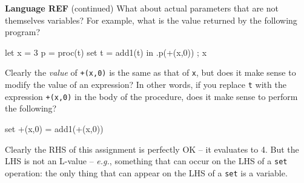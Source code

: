\begin{minipage}[t]{\sw}
\slidenumber
\LARGE
{\bf Language REF} (continued)\exx
What about actual parameters that are not themselves variables?
For example, what is the value returned by the following program?
\begin{qv}
let
  x = 3
  p = proc(t) set t = add1(t)
in
  { .p(+(x,0)) ; x }
\end{qv}
Clearly the {\em value} of \verb'+(x,0)' is the same
as that of \verb'x',
but does it make sense to modify the value of an expression?
In other words, if you replace \verb't' with the expression \verb'+(x,0)'
in the body of the procedure,
does it make sense to perform the following?
\begin{qv}
set +(x,0) = add1(+(x,0))
\end{qv}
Clearly the RHS of this assignment is perfectly OK --
it evaluates to 4.
But the LHS is not an L-value --
{\em e.g.}, something that can occur
on the LHS of a \verb'set' operation:
the only thing that can appear on the LHS of a \verb'set' is a variable.\exx
\end{minipage}

